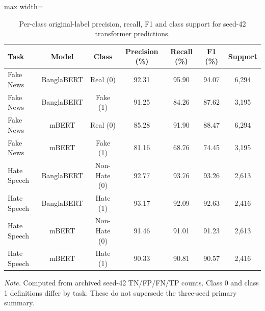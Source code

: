 \begin{table}[t]
\centering
\caption{Per-class original-label precision, recall, F1 and class support for seed-42 transformer predictions.}
\label{tab:perclass}
\footnotesize
\begin{adjustbox}{max width=\linewidth}
\begin{tabular}{lcccccc}
\toprule
Task & Model & Class & Precision (\%) & Recall (\%) & F1 (\%) & Support \\
\midrule
Fake News & BanglaBERT & Real (0) & 92.31 & 95.90 & 94.07 & 6,294 \\
Fake News & BanglaBERT & Fake (1) & 91.25 & 84.26 & 87.62 & 3,195 \\
Fake News & mBERT & Real (0) & 85.28 & 91.90 & 88.47 & 6,294 \\
Fake News & mBERT & Fake (1) & 81.16 & 68.76 & 74.45 & 3,195 \\
Hate Speech & BanglaBERT & Non-Hate (0) & 92.77 & 93.76 & 93.26 & 2,613 \\
Hate Speech & BanglaBERT & Hate (1) & 93.17 & 92.09 & 92.63 & 2,416 \\
Hate Speech & mBERT & Non-Hate (0) & 91.46 & 91.01 & 91.23 & 2,613 \\
Hate Speech & mBERT & Hate (1) & 90.33 & 90.81 & 90.57 & 2,416 \\
\bottomrule
\end{tabular}
\end{adjustbox}
\par\vspace{2pt}
\begin{minipage}{\linewidth}
\scriptsize\emph{Note.} Computed from archived seed-42 TN/FP/FN/TP counts. Class 0 and class 1 definitions differ by task. These do not supersede the three-seed primary summary.
\end{minipage}
\end{table}

